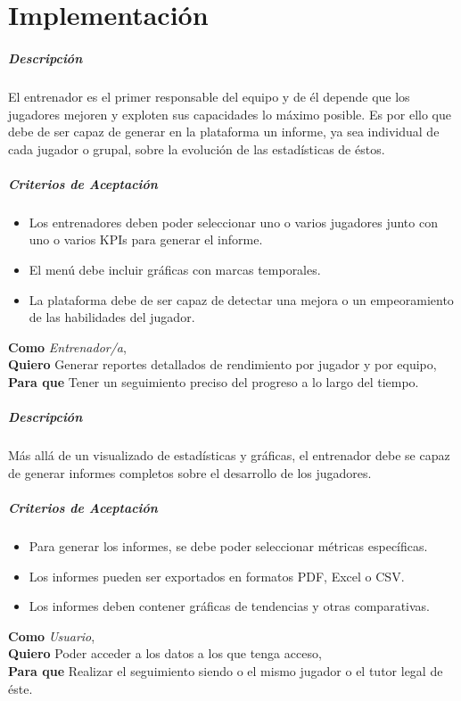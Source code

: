 \section{Implementación}

\subparagraph{Descripción}
El entrenador es el primer responsable del equipo y de él depende que los jugadores mejoren y exploten sus capacidades lo máximo posible. Es por ello que debe de ser capaz de generar en la plataforma un informe, ya sea individual de cada jugador o grupal, sobre la evolución de las estadísticas de éstos.

\subparagraph{Criterios de Aceptación}
\begin{itemize}
    \item Los entrenadores deben poder seleccionar uno o varios jugadores junto con uno o varios KPIs para generar el informe.
    \item El menú debe incluir gráficas con marcas temporales.
    \item La plataforma debe de ser capaz de detectar una mejora o un empeoramiento de las habilidades del jugador.
\end{itemize}


\begin{tcolorbox}[title=Historia de Usuario: Análisis y Reportes Detallados]
\textbf{Como} \textit{Entrenador/a},\\
\textbf{Quiero} Generar reportes detallados de rendimiento por jugador y por equipo,\\
\textbf{Para que} Tener un seguimiento preciso del progreso a lo largo del tiempo.
\end{tcolorbox}

\subparagraph{Descripción}
Más allá de un visualizado de estadísticas y gráficas, el entrenador debe se capaz de generar informes completos sobre el desarrollo de los jugadores.

\subparagraph{Criterios de Aceptación}
\begin{itemize}
    \item Para generar los informes, se debe poder seleccionar métricas específicas.
    \item Los informes pueden ser exportados en formatos PDF, Excel o CSV.
    \item Los informes deben contener gráficas de tendencias y otras comparativas.
\end{itemize}

\begin{tcolorbox}[title=Historia de Usuario: Acceso a roles de usuario]
\textbf{Como} \textit{Usuario},\\
\textbf{Quiero} Poder acceder a los datos a los que tenga acceso,\\
\textbf{Para que} Realizar el seguimiento siendo o el mismo jugador o el tutor legal de éste.
\end{tcolorbox}

